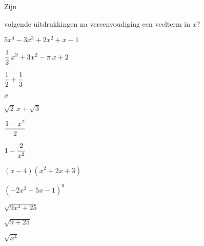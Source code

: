\documentclass{ximera}
\begin{document}
\begin{exercise}
\hypertarget{oef1.3}{Zijn} volgende uitdrukkingen na vereenvoudiging een veelterm in $x$? 
\renewcommand{\TJa }{\makebox[2.5cm]{Veelterm}}
\renewcommand{\TNee}{\makebox[2.5cm]{Geen veelterm}}
\begin{multicols}{2}

	\begin{question} \choiceYes \( 5x^4-3x^3+2x^2+x-1                    \)   \end{question}
	\begin{question} \choiceYes \( \displaystyle \frac{1}{2}\,x^3 + 3x^2-\pi\,x+2   \)   \end{question}
	\begin{question} \choiceYes \( \displaystyle \frac{1}{2}+\frac{1}{3}            \)   \end{question}
	\begin{question} \choiceYes \( x                                     \)   \end{question}
	\begin{question} \choiceYes \( \sqrt{2}\,x + \sqrt{3}                \)   \end{question}
	\begin{question} \choiceYes \( \displaystyle \frac{1-x^2}{2}                    \)   \end{question}
	\begin{question} \choiceNo  \( \displaystyle 1-\frac{2}{x^2}                    \)   \end{question}
	\begin{question} \choiceYes \( (x-4)(x^2+2x+3)                       \)   \end{question}
	\begin{question} \choiceYes \( (-2x^2+5x-1)^{9}                      \)   \end{question}
	\begin{question} \choiceNo  \( \sqrt{9x^4+25}                        \)   \end{question}
	\begin{question} \choiceYes \( \sqrt{9+25}                           \)   \end{question}
	\begin{question} \choiceYes \( \sqrt{x^4}                            \)   \end{question}

\end{multicols}
\end{exercise}
\end{document}
